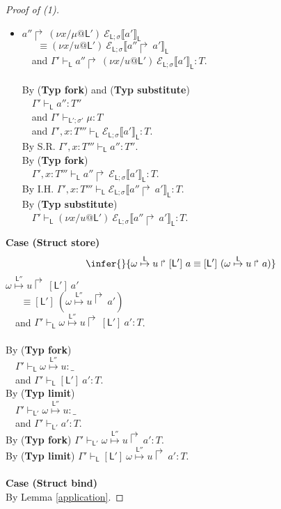 \documentclass{sigplanconf}
\newcommand{\lab}{\mathsf L}
\newcommand{\new}[2]{(\nu #1)\:#2}
\newcommand{\fork}[2]{#1\Rsh\:\!#2}
\newcommand{\store}[1]{\stackrel{#1}\mapsto}
\newcommand{\sctx}[2]{\mathcal E_{\lab;\sigma}\llbracket#1\rrbracket_{#2}}
\newcommand{\trule}[1]{(\textbf{Typ #1})}
\begin{document}
\begin{proof}[Proof of (1)]
\begin{itemize}
By \trule{fork} \\
$~~~$ $\Gamma' \vdash_{\lab} \fork{b'}{\sctx{\fork{a''}a'}{\lab}}
  : T$.\\
\item 
$\fork{a''}\new{x/\mu@\lab'}{\sctx{a'}{\lab}}$\\
$~~~~~~~ \equiv\new{x/u@\lab'}{\sctx{\fork{a''}a'}{\lab}}$\\
$~~~$ and $\Gamma' \vdash_{\lab} \fork{a''}\new{x/u@\lab'}{\sctx{a'}{\lab}}
  : T$.\\
  \\
By \trule{fork} and \trule{substitute} \\
$~~~$ $\Gamma' \vdash_{\lab} a''
  : T''$\\
$~~~$ and $\Gamma' \vdash_{\lab';\sigma'} \mu
  : T$\\
$~~~$ and $\Gamma', x: T''' \vdash_{\lab} \sctx{a'}{\lab}
  : T$.\\
By S.R. $\Gamma', x: T'''  \vdash_{\lab} a''
  : T''$.\\
By \trule{fork} \\
$~~~$ $\Gamma', x: T''' \vdash_{\lab} \fork{a''}\sctx{a'}{\lab}
  : T$.\\
By I.H. $\Gamma', x: T''' \vdash_{\lab} \sctx{\fork{a''}a'}{\lab}
  : T$.\\
By \trule{substitute} \\
$~~~$ $\Gamma' \vdash_{\lab} \new{x/u@\lab'}{\sctx{\fork{a''}a'}{\lab}}
  : T$.
\end{itemize}
{\bf Case (Struct store)}
    $$\infer
    {}
    {\fork{\omega \store\lab u}[\lab']~a \equiv [\lab']~(\fork{\omega \store\lab u} a)}
    $$
$\fork{\omega \store{\lab''} u}[\lab']~a'$\\
$~~~~~~~ \equiv [\lab']~(\fork{\omega \store{\lab''} u} a')$\\
$~~~$ and $\Gamma' \vdash_{\lab} \fork{\omega \store{\lab''} u}[\lab']~a'
  : T$.\\
  \\
By \trule{fork} \\
$~~~$ $\Gamma' \vdash_{\lab} \omega \store{\lab''} u
  : \_$ \\
$~~~$ and $\Gamma' \vdash_{\lab} [\lab']~a'
  : T$.\\
By \trule{limit} \\
$~~~$ $\Gamma' \vdash_{\lab'} \omega \store{\lab''} u
  : \_$ \\
$~~~$ and $\Gamma' \vdash_{\lab'} a'
  : T$.\\
By \trule{fork} $\Gamma' \vdash_{\lab'} \fork{\omega \store{\lab''} u}a'
  : T$.\\    
By \trule{limit} $\Gamma' \vdash_{\lab} [\lab']~\fork{\omega \store{\lab''} u}a'
  : T$.\\
\\
{\bf Case (Struct bind)}\\
By Lemma \ref{application}.
\end{proof}
\end{document}
